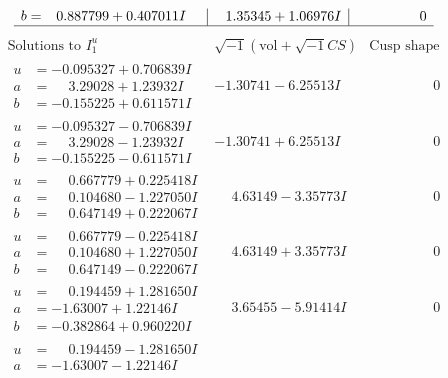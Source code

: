 \documentclass[1p]{elsarticle_modified}
\theoremstyle{definition}
\newcommand{\I}{\sqrt{-1}}
\begin{document}
$$\begin{array}{c|c|c}
\begin{aligned}
b &= \phantom{-}0.887799 + 0.407011 I\end{aligned}
 & \phantom{-}1.35345 + 1.06976 I & \phantom{-0.000000 } 0\\
 \hline 
 \end{array}$$\newpage$$\begin{array}{c|c|c}  
\text{Solutions to }I^u_{1}& \I (\text{vol} + \sqrt{-1}CS) & \text{Cusp shape}\\
 \hline 
\begin{aligned}
u &= -0.095327 + 0.706839 I \\
a &= \phantom{-}3.29028 + 1.23932 I \\
b &= -0.155225 + 0.611571 I\end{aligned}
 & -1.30741 - 6.25513 I & \phantom{-0.000000 } 0 \\ \hline\begin{aligned}
u &= -0.095327 - 0.706839 I \\
a &= \phantom{-}3.29028 - 1.23932 I \\
b &= -0.155225 - 0.611571 I\end{aligned}
 & -1.30741 + 6.25513 I & \phantom{-0.000000 } 0 \\ \hline\begin{aligned}
u &= \phantom{-}0.667779 + 0.225418 I \\
a &= \phantom{-}0.104680 - 1.227050 I \\
b &= \phantom{-}0.647149 + 0.222067 I\end{aligned}
 & \phantom{-}4.63149 - 3.35773 I & \phantom{-0.000000 } 0 \\ \hline\begin{aligned}
u &= \phantom{-}0.667779 - 0.225418 I \\
a &= \phantom{-}0.104680 + 1.227050 I \\
b &= \phantom{-}0.647149 - 0.222067 I\end{aligned}
 & \phantom{-}4.63149 + 3.35773 I & \phantom{-0.000000 } 0 \\ \hline\begin{aligned}
u &= \phantom{-}0.194459 + 1.281650 I \\
a &= -1.63007 + 1.22146 I \\
b &= -0.382864 + 0.960220 I\end{aligned}
 & \phantom{-}3.65455 - 5.91414 I & \phantom{-0.000000 } 0 \\ \hline\begin{aligned}
u &= \phantom{-}0.194459 - 1.281650 I \\
a &= -1.63007 - 1.22146 I \\

\end{aligned}
\end{array}$$
\end{document}
